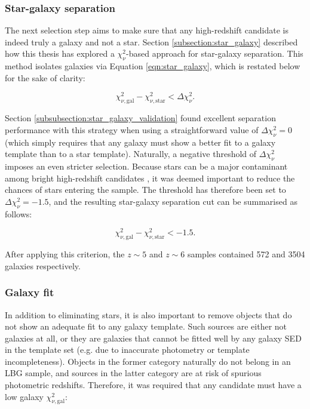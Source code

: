 \subsubsection{Star-galaxy separation}
The next selection step aims to make sure that any high-redshift candidate is indeed truly a galaxy and not a star.  Section \ref{subsection:star_galaxy} described how this thesis has explored a $\chi_{\nu}^2$-based approach for star-galaxy separation. This method isolates galaxies via Equation \ref{eqn:star_galaxy}, which is restated below for the sake of clarity: 

\begin{equation*}
\chi^2_{\nu,\mathrm{gal}} - \chi^2_{\nu,\mathrm{star}} <  \Delta \chi^2_{\nu}. 
\end{equation*}

Section \ref{subsubsection:star_galaxy_validation} found excellent separation performance with this strategy when using a straightforward value of $\Delta \chi^2_{\nu}=0$ (which simply requires that any galaxy must show a better fit to a galaxy template than to a star template). Naturally, a negative threshold of $\Delta \chi^2_{\nu}$ imposes an even stricter selection. Because stars can be a major contaminant among bright high-redshift candidates \citep{2013AJ....145....4W,2015MNRAS.452.1817B}, it was deemed important to reduce the chances of stars entering the sample. The threshold has therefore been set to $\Delta \chi^2_{\nu}=-1.5$, and the resulting star-galaxy separation cut can be summarised as follows: 

\begin{equation}
\chi^2_{\nu,\mathrm{gal}} - \chi^2_{\nu,\mathrm{star}} <  -1.5. \label{eqn:first_star_galaxy}
\end{equation}

\noindent After applying this criterion, the $z\sim5$ and $z\sim6$ samples contained 572 and 3504 galaxies respectively. \par 


\subsubsection{Galaxy fit}
In addition to eliminating stars, it is also important to remove objects that do not show an adequate fit to any galaxy template. Such sources are either not galaxies at all, or they are galaxies that cannot be fitted well by any galaxy SED in the template set (e.g. due to inaccurate photometry or template incompleteness). Objects in the former category naturally do not belong in an LBG sample, and sources in the latter category are at risk of spurious photometric redshifts. Therefore, it was required that any candidate must have a low galaxy $\chi^2_{\nu,\mathrm{gal}}$: 

